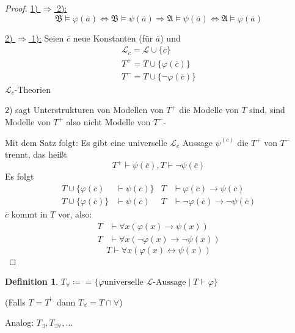 \documentclass[12pt,parskip=full]{scrartcl}
\newcommand{\heading}{\underline}
\theoremstyle{definition}
\newtheorem{definition}[theorem]{Definition}
\begin{document}
	\begin{proof}
		\heading{1) $\Rightarrow$ 2):}
		\begin{equation*}
			\mathfrak{B} \models \varphi(\overline{a}) \Leftrightarrow \mathfrak{B} \models \psi(\overline{a}) \Rightarrow \mathfrak{A} \models \psi(\overline{a}) \Leftrightarrow \mathfrak{A} \models \varphi(\overline{a})
		\end{equation*}
		
		\heading{2) $\Rightarrow$ 1):}
		Seien $\overline{c}$ neue Konstanten (für $\overline{a}$) und
		\begin{align*}
			\mathcal{L}_c = \mathcal{L} \cup \{ \overline{c} \} \\
			T^+ = T \cup \{ \varphi(\overline{c}) \} \\
			T^- =  T \cup \{ \lnot \varphi(\overline{c}) \}
		\end{align*}
		$\mathcal{L}_c$-Theorien
		
		2) sagt Unterstrukturen von Modellen von $T^+$ die Modelle von $T$ sind, sind Modelle von $T^+$ also nicht Modelle von $T^-$-
		
		Mit dem Satz folgt: Es gibt eine universelle $\mathcal{L}_c$ Aussage $\psi^{(c)}$ die $T^+$ von $T^-$ trennt, das heißt
		\begin{equation*}
			T^+ \vdash \psi(\overline{c}), T \vdash \lnot \psi(\overline{c})
		\end{equation*}
		Es folgt
		\begin{align*}
			T \cup \{ \varphi(\overline{c}) &\vdash \psi(\overline{c}) \} & T &\vdash \varphi(\overline{c}) \rightarrow \psi(\overline{c}) \\
			T \cup \{ \varphi(\overline{c}) \} &\vdash \psi(\overline{c}) & T &\vdash \lnot \varphi(\overline{c}) \rightarrow \lnot \psi(\overline{c})
		\end{align*}
		$\overline{c}$ kommt in $T$ vor, also:
		\begin{align*}
			T &\vdash \forall x (\varphi(x) \rightarrow \psi(x)) \\
			T &\vdash \forall x (\lnot \varphi(x) \rightarrow \lnot \psi(x))
		\end{align*}
		\begin{equation*}
			T \vdash \forall x (\varphi(x) \leftrightarrow \psi(x))
		\end{equation*}
	\end{proof}

	\begin{definition}
		$T_\forall \coloneqq = \{ \varphi \text{universelle $\mathcal{L}$-Aussage} \mid T \vdash \varphi \}$
		
		(Falls $T = T^\vdash$ dann $T_\forall = T \cap \forall$)
		
		Analog: $T_\exists, T_{\exists\forall}, \dots$
	\end{definition}
\end{document}
